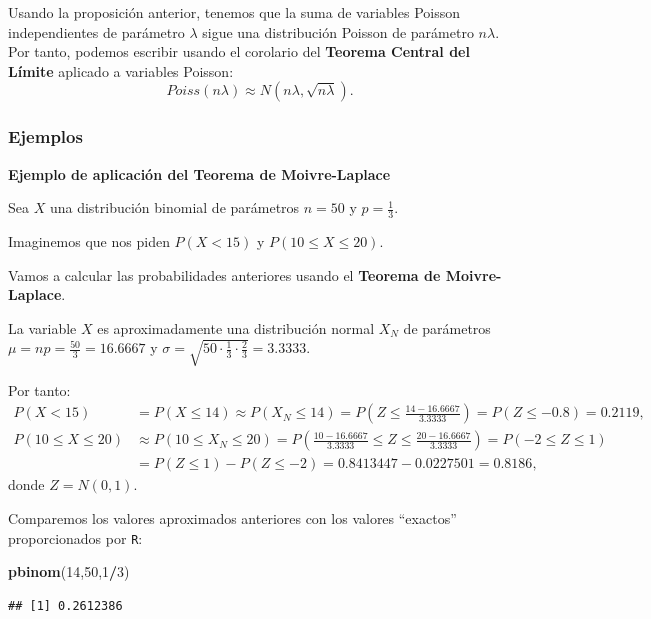 \documentclass[]{book}
\newenvironment{Shaded}{\begin{snugshade}}{\end{snugshade}}
\newcommand{\DecValTok}[1]{\textcolor[rgb]{0.00,0.00,0.81}{#1}}
\newcommand{\KeywordTok}[1]{\textcolor[rgb]{0.13,0.29,0.53}{\textbf{#1}}}
\newcommand{\NormalTok}[1]{#1}
\newcommand{\OperatorTok}[1]{\textcolor[rgb]{0.81,0.36,0.00}{\textbf{#1}}}
\begin{document}
Usando la proposición anterior, tenemos que la suma de variables Poisson independientes de parámetro \(\lambda\) sigue una distribución Poisson de parámetro \(n\lambda\). Por tanto, podemos escribir usando el corolario del \textbf{Teorema Central del Límite} aplicado a variables Poisson:
\[
Poiss(n\lambda)\approx N(n\lambda,\sqrt{n\lambda}).
\]

\hypertarget{ejemplos-25}{%
\subsubsection{Ejemplos}\label{ejemplos-25}}

\textbf{Ejemplo de aplicación del Teorema de Moivre-Laplace}

Sea \(X\) una distribución binomial de parámetros \(n=50\) y \(p=\frac{1}{3}\).

Imaginemos que nos piden \(P(X < 15)\) y \(P(10\leq X\leq 20)\).

Vamos a calcular las probabilidades anteriores usando el \textbf{Teorema de Moivre-Laplace}.

La variable \(X\) es aproximadamente una distribución normal \(X_N\) de parámetros \(\mu = np=\frac{50}{3}=16.6667\) y \(\sigma=\sqrt{50\cdot\frac{1}{3}\cdot \frac{2}{3}}=3.3333\).

Por tanto:
\[
\begin{array}{rl}
P(X< 15) & = P(X\leq 14) \approx P(X_N \leq 14)=P\left(Z\leq \frac{14-16.6667}{3.3333}\right) =P(Z\leq -0.8) = 0.2119,\\
P(10\leq X\leq 20) & \approx P(10\leq X_N \leq 20) = P\left(\frac{10-16.6667}{3.3333}\leq  Z\leq \frac{20-16.6667}{3.3333}\right) = P(-2\leq Z\leq 1) \\ & = P(Z\leq 1)-P(Z\leq -2)=0.8413447-0.0227501 = 0.8186,
\end{array}
\]
donde \(Z=N(0,1)\).

Comparemos los valores aproximados anteriores con los valores ``exactos'' proporcionados por \texttt{R}:

\begin{Shaded}
\begin{Highlighting}[]
\KeywordTok{pbinom}\NormalTok{(}\DecValTok{14}\NormalTok{,}\DecValTok{50}\NormalTok{,}\DecValTok{1}\OperatorTok{/}\DecValTok{3}\NormalTok{)}
\end{Highlighting}
\end{Shaded}

\begin{verbatim}
## [1] 0.2612386
\end{verbatim}
\end{document}
